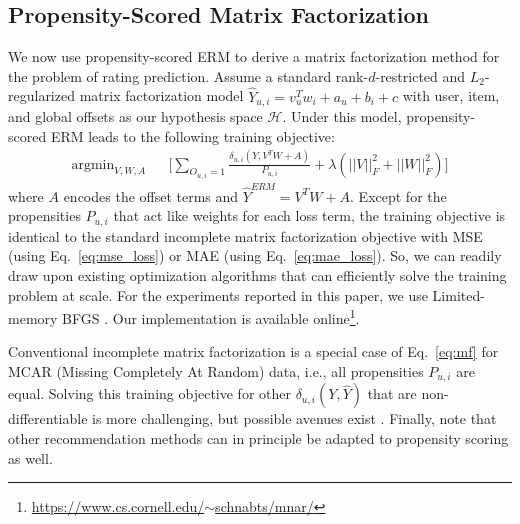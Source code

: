 \documentclass{article}
\DeclareMathOperator*{\argmin}{argmin}
\newcommand{\user}{u}                       %
\newcommand{\movie}{i}                      %
\newcommand{\ytrue}{Y}                      %
\newcommand{\ypred}{\hat{Y}}                %
\newcommand{\ypredelem}[1]{\ypred_{#1}}
\newcommand{\ypredum}{\ypredelem{\user,\movie}}
\newcommand{\loss}[3]{\delta_{#1}(#2,#3)}   %
\newcommand{\lossum}{\loss{\user,\movie}{\ytrue}{\ypred}}
\newcommand{\obs}{O}                        %
\newcommand{\obselem}[1]{\obs_{#1}}
\newcommand{\obsum}{\obselem{\user,\movie}}
\newcommand{\probobs}{P}                    %
\newcommand{\probobselem}[1]{\probobs_{#1}}
\newcommand{\probobsum}{\probobselem{\user,\movie}}
\newcommand{\hypspace}{\mathcal{H}}         %
\begin{document}
\subsection{Propensity-Scored Matrix Factorization}
We now use propensity-scored ERM to derive a matrix factorization method for the problem of rating prediction. Assume a standard rank-$d$-restricted and $L_2$-regularized matrix factorization model $\ypredum=v_\user^T w_\movie + a_{\user} + b_{\movie} + c$ with user, item, and global offsets as our hypothesis space $\hypspace$. Under this model, propensity-scored ERM leads to the following training objective:
\begin{eqnarray}
\!\!\!\!\!\!\!\!\argmin_{V,W,A} && \!\!\!\!\!\!\!\!\!\!\!\!\!\Bigg[ \!\sum_{\obsum=1} \!\!\!\!\!\frac{\loss{\user,\movie}{\ytrue}{V^T \!W\!\!+\!\!A}}{\probobsum} + \lambda \!\left(||V||_F^2 \!\!+\!\!||W||_F^2\right)\!\Bigg] \label{eq:mf}
\end{eqnarray}
where $A$ encodes the offset terms and $\ypred^{ERM}=V^T W+A$.
Except for the propensities $\probobsum$ that act like weights for each loss term, the training objective is identical to the standard incomplete matrix factorization objective \cite{Koren,Steck,Hu/etal/08} with MSE (using Eq.~\eqref{eq:mse_loss}) or MAE (using Eq.~\eqref{eq:mae_loss}). %
So, we can readily draw upon existing optimization algorithms \citep[i.e.,][]{gemulla2011large,yu2012scalable} that can efficiently solve the training problem at scale. For the experiments reported in this paper, we use Limited-memory BFGS \cite{byrd1995limited}. Our implementation is available online\footnote{\href{https://www.cs.cornell.edu/~schnabts/mnar/}{https://www.cs.cornell.edu/$\sim$schnabts/mnar/}}.

Conventional incomplete matrix factorization is a special case of Eq.~\eqref{eq:mf} for MCAR (Missing Completely At Random) data, i.e., all propensities $\probobsum$ are equal. Solving this training objective for other $\lossum$ that are non-differentiable is more challenging, but possible avenues exist \cite{Joachims/05a,chapelle2010gradient}. Finally, note that other recommendation methods \citep[e.g.,][]{weimer2007maximum,lin2007projected} can in principle be adapted to propensity scoring as well. 
\end{document}
